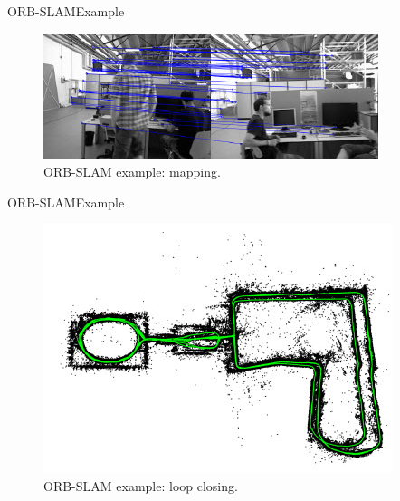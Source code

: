 \documentclass{beamer}
\begin{document}
\begin{frame}{ORB-SLAM}{Example}
  \begin{figure}
\includegraphics[scale=0.9]{Figure/ORBexMapping}
\caption{ORB-SLAM example: mapping.}
\end{figure}
\end{frame}

\begin{frame}{ORB-SLAM}{Example}
  \begin{figure}
\includegraphics[scale=0.7]{Figure/ORBexLoopClosing}
\caption{ORB-SLAM example: loop closing.}
\end{figure}
\end{frame}
\end{document}
